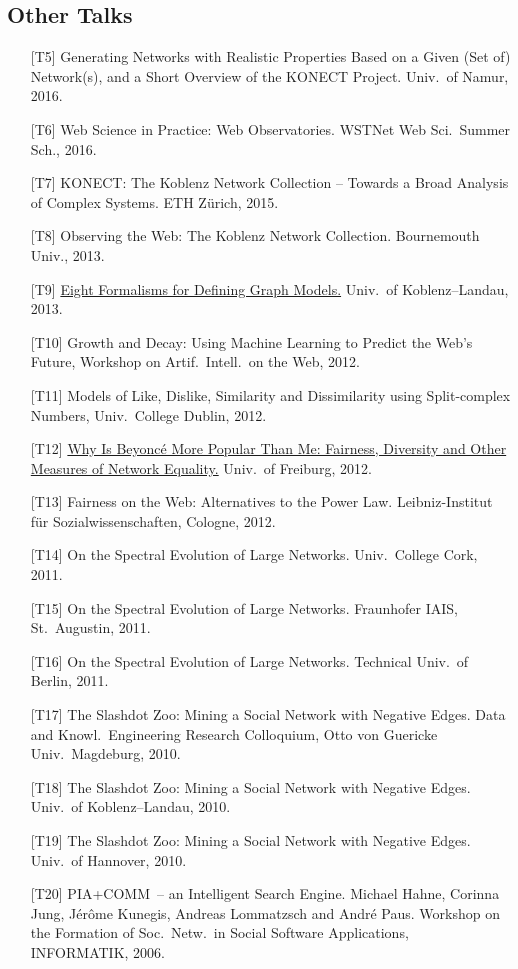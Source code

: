 \documentclass[line,mm]{res}
\newcounter{x}
\begin{document}
\begin{resume}
\section{Other Talks}
\begin{itemize}
  \item[{[T5]}] Generating Networks with Realistic Properties Based on a
    Given (Set of) Network(s), and a Short Overview of the KONECT
    Project.  Univ.\ of Namur, 2016. 
  \item[{[T6]}] Web Science in Practice:  Web Observatories.  WSTNet Web
    Sci.\ Summer Sch., 2016.  
  \item[{[T7]}] KONECT: The Koblenz Network Collection -- Towards a Broad
    Analysis of Complex Systems.  ETH Zürich, 2015.
  \item[{[T8]}] Observing the Web: The Koblenz Network Collection.
    Bournemouth Univ., 2013.
  \item[{[T9]}] \href{https://www.slideshare.net/kunegis/eight-ways}{Eight Formalisms for Defining Graph Models.}  Univ.\ of Koblenz--Landau, 2013. 
  \item[{[T10]}] Growth and Decay: Using Machine Learning to Predict the Web's
    Future, Workshop on Artif.\ Intell.\ on the Web, 2012. 
  \item[{[T11]}] Models of Like, Dislike, Similarity and Dissimilarity using
    Split-complex Numbers, Univ.\ College Dublin, 2012. 
  \item[{[T12]}] \href{https://www.slideshare.net/kunegis/why-beyonc-is-more-popular-than-me-fairness-diversity-and-other-measures}{Why Is Beyoncé More Popular Than Me:  Fairness, Diversity and
    Other Measures of Network Equality.} Univ.\ of Freiburg, 2012. 
  \item[{[T13]}] Fairness on the Web: Alternatives to the Power
    Law. 
    Leibniz-Institut für Sozialwissenschaften, Cologne, 2012.  
  \item[{[T14]}] On the Spectral Evolution of Large Networks.  Univ.\ College
    Cork, 2011.   
  \item[{[T15]}] On the Spectral Evolution of Large Networks.  Fraunhofer IAIS,
    St.\ Augustin, 2011.  
  \item[{[T16]}] On the Spectral Evolution of Large Networks. Technical
    Univ.\ of Berlin, 2011.  
  \item[{[T17]}] The Slashdot Zoo: Mining a Social Network with Negative
    Edges. Data and Knowl.\ Engineering Research Colloquium,
    Otto von Guericke Univ.\ Magdeburg, 2010.  
  \item[{[T18]}] The Slashdot Zoo: Mining a Social Network with Negative
    Edges. Univ.\ of Koblenz--Landau, 2010. 
  \item[{[T19]}] The Slashdot Zoo: Mining a Social Network with Negative
    Edges. Univ.\ of Hannover, 2010. 
  \item[{[T20]}] PIA+COMM~-- an Intelligent Search Engine.
    Michael Hahne, Corinna Jung, Jérôme Kunegis, Andreas Lommatzsch and
    André Paus. 
    Workshop on the Formation of Soc.\ Netw.\ in Social Software
    Applications, INFORMATIK, 2006. 
\end{itemize}


\end{resume}
\end{document}
